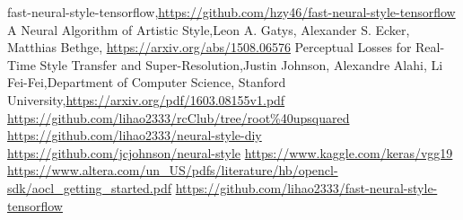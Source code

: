 \begin{thebibliography}{9}

  fast-neural-style-tensorflow,\url{https://github.com/hzy46/fast-neural-style-tensorflow}
  A Neural Algorithm of Artistic Style,Leon A. Gatys, Alexander S. Ecker, Matthias Bethge, \url{https://arxiv.org/abs/1508.06576}
  Perceptual Losses for Real-Time Style Transfer and Super-Resolution,Justin Johnson, Alexandre Alahi, Li Fei-Fei,Department of Computer Science, Stanford University,\url{https://arxiv.org/pdf/1603.08155v1.pdf}
\url{https://github.com/lihao2333/rcClub/tree/root\%40upsquared}
\url{https://github.com/lihao2333/neural-style-diy}
\url{https://github.com/jcjohnson/neural-style}
\url{https://www.kaggle.com/keras/vgg19}
\url{https://www.altera.com/un\_US/pdfs/literature/hb/opencl-sdk/aocl\_getting\_started.pdf}
  \url{https://github.com/lihao2333/fast-neural-style-tensorflow}
\end{thebibliography}
 
\clearpage
